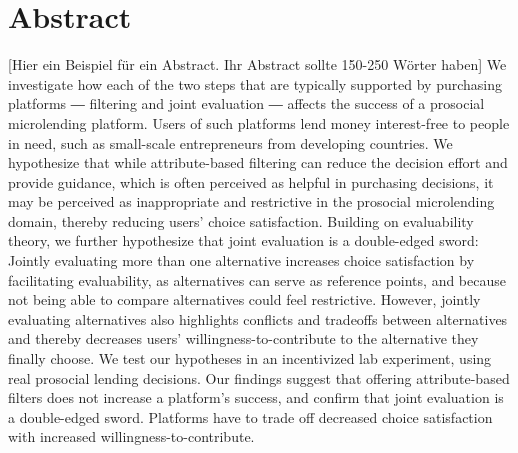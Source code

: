 \chapter*{Abstract} 
[Hier ein Beispiel für ein Abstract. Ihr Abstract sollte 150-250 Wörter haben] We investigate how each of the two steps that are typically supported by purchasing platforms ― filtering and joint evaluation ― affects the success of a prosocial microlending platform. Users of such platforms lend money interest-free to people in need, such as small-scale entrepreneurs from developing countries. We hypothesize that while attribute-based filtering can reduce the decision effort and provide guidance, which is often perceived as helpful in purchasing decisions, it may be perceived as inappropriate and restrictive in the prosocial microlending domain, thereby reducing users’ choice satisfaction. Building on evaluability theory, we further hypothesize that joint evaluation is a double-edged sword: Jointly evaluating more than one alternative increases choice satisfaction by facilitating evaluability, as alternatives can serve as reference points, and because not being able to compare alternatives could feel restrictive. However, jointly evaluating alternatives also highlights conflicts and tradeoffs between alternatives and thereby decreases users’ willingness-to-contribute to the alternative they finally choose. We test our hypotheses in an incentivized lab experiment, using real prosocial lending decisions. Our findings suggest that offering attribute-based filters does not increase a platform’s success, and confirm that joint evaluation is a double-edged sword. Platforms have to trade off decreased choice satisfaction with increased willingness-to-contribute.

\newpage
